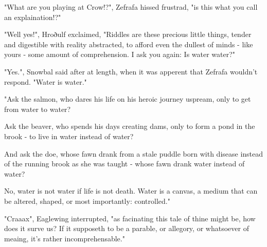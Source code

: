 "What are you playing at Crow!?", Zefrafa hissed frustrad, "is this what you call an explaination!?"

"Well yes!", Hroðulf exclaimed, "Riddles are these precious little things, tender and digestible with reality abstracted, to afford even the dullest of minds - like yours - some amount of comprehension. I ask you again: Is water water?"

"Yes.", Snowbal said after at length, when it was apperent that Zefrafa wouldn't respond. "Water is water."

"Ask the salmon, who dares his life on his heroic journey uspream, only to get from water to water?

Ask the beaver, who spends his days creating dams, only to form a pond in the brook - to live in water instead of water?

And ask the doe, whose fawn drank from a stale puddle born with disease instead of the running brook as she was taught - whose fawn drank water instead of water?

No, water is not water if life is not death. Water is a canvas, a medium that can be altered, shaped, or most importantly: controlled."

"Craaax", Eaglewing interrupted, "as facinating this tale of thine might be, how does it surve us? If it supposeth to be a parable, or allegory, or whatsoever of meaing, it's rather incomprehensable."







